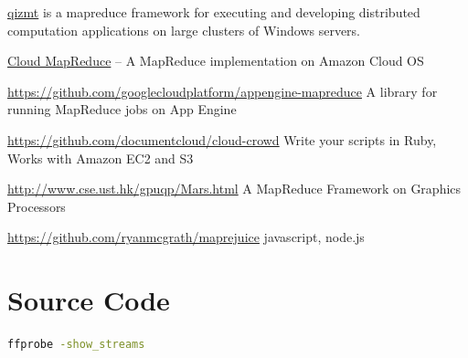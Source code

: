 \documentclass[letter,11pt,onecolumn]{book}
\begin{document}
\href{https://code.google.com/p/qizmt/}{qizmt} is a mapreduce framework for executing and developing distributed computation applications on large clusters of Windows servers.




\href{https://code.google.com/p/cloudmapreduce/}{Cloud MapReduce} -- A MapReduce implementation on Amazon Cloud OS

\url{https://github.com/googlecloudplatform/appengine-mapreduce}
A library for running MapReduce jobs on App Engine




\url{https://github.com/documentcloud/cloud-crowd}
Write your scripts in Ruby, Works with Amazon EC2 and S3



\url{http://www.cse.ust.hk/gpuqp/Mars.html}
A MapReduce Framework on Graphics Processors


\url{https://github.com/ryanmcgrath/maprejuice}
javascript, node.js

\chapter{Source Code}

\begin{lstlisting}[language=bash]
ffprobe -show_streams
\end{lstlisting}
\end{document}
